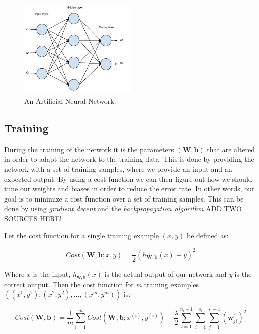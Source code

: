 \begin{figure}[h!]
  \centering
      \includegraphics[width=0.5\textwidth]{Figures/Background/ann}
  \caption{An Artificial Neural Network.}
\end{figure}


\subsection{Training} \label{sec_ann_training}
During the training of the network it is the parameters $ (\mathbf{W, b}) $ that are altered in order to adapt the network to the training data. This is done by providing the network with a set of training samples, where we provide an input and an expected output. By using a cost function we can then figure out how we should tune our weights and biases in order to reduce the error rate. In other words, our goal is to minimize a cost function over a set of training samples. This can be done by using \textit{gradient decent} and the \textit{backpropagation algorithm} \cite{LeCun1998} ADD TWO SOURCES HERE! 

Let the cost function for a single training example $(x,y)$ be defined as:

\begin{equation}
	Cost(\mathbf{W},\mathbf{b}; x, y) = \frac{1}{2}(h_{\mathbf{W},\mathbf{b}}(x) - y)^2
\end{equation}

Where $ x $ is the input, $ h_{\mathbf{w},b}(x) $ is the actual output of our network and \textit{y} is the correct output.
Then the cost function for \textit{m} training examples $ ((x^{1}, y^{1}), (x^{2}, y^{2}), \dots, (x^{m}, y^{m})) $ is:

\begin{equation}
	Cost(\mathbf{W},\mathbf{b}) = \frac{1}{m}\sum_{i=1}^{m}Cost(\mathbf{W},\mathbf{b};x^{(i)},y^{(i)}) + \frac{\lambda}{2}
	\sum_{l=1}^{n_l-1}\sum_{i=1}^{s_l}\sum_{j=1}^{s_l+1}
	(\mathbf{w}_{ji}^{l})^2
\end{equation}
 
